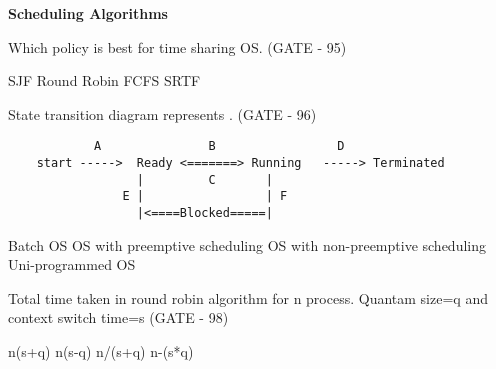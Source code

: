 
\centerline{\textbf{ \LARGE Scheduling Algorithms}}



\begin{questyle}

\question Which policy is best for time sharing OS. (GATE - 95)

\begin{oneparchoices}
   \choice SJF
   \CorrectChoice Round Robin
   \choice FCFS
   \choice SRTF
\end{oneparchoices}

  \end{questyle}




\begin{questyle}


\question State transition diagram represents . (GATE - 96)
  \begin{lstlisting}
            A               B                 D
    start ----->  Ready <=======> Running   -----> Terminated
                  |         C       |
                E |                 | F
                  |<====Blocked=====|
  \end{lstlisting}

\begin{choices}
   \choice Batch OS
   \CorrectChoice OS with preemptive scheduling
   \choice OS with non-preemptive scheduling
   \choice Uni-programmed OS
\end{choices}


  \end{questyle}





\begin{questyle}

\question Total time taken in round robin algorithm for n process. Quantam size=q and context switch time=s  (GATE - 98)


\begin{oneparchoices}
   \CorrectChoice n(s+q)
   \choice n(s-q)
   \choice n/(s+q)
   \choice n-(s*q)
\end{oneparchoices}


  \end{questyle}



